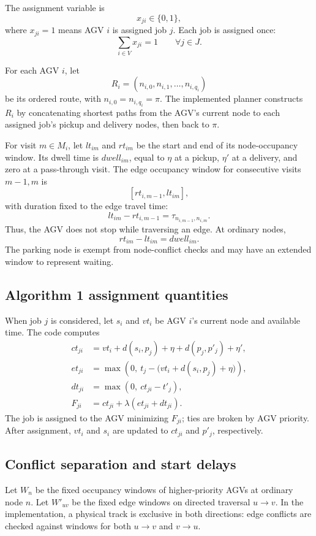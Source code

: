 The assignment variable is
\[
  x_{ji}\in\{0,1\},
\]
where $x_{ji}=1$ means AGV $i$ is assigned job $j$. Each job is assigned once:
\[
  \sum_{i\in V}x_{ji}=1\qquad \forall j\in J.
\]

For each AGV $i$, let
\[
  R_i=(n_{i,0},n_{i,1},\ldots,n_{i,q_i})
\]
be its ordered route, with $n_{i,0}=n_{i,q_i}=\pi$. The implemented planner
constructs $R_i$ by concatenating shortest paths from the AGV's current node
to each assigned job's pickup and delivery nodes, then back to $\pi$.

For visit $m\in M_i$, let $lt_{im}$ and $rt_{im}$ be the start and end of its
node-occupancy window. Its dwell time is $dwell_{im}$, equal to $\eta$ at a
pickup, $\eta'$ at a delivery, and zero at a pass-through visit. The edge
occupancy window for consecutive visits $m-1,m$ is
\[
  [rt_{i,m-1},lt_{im}],
\]
with duration fixed to the edge travel time:
\[
  lt_{im}-rt_{i,m-1}=\tau_{n_{i,m-1},n_{i,m}}.
\]
Thus, the AGV does not stop while traversing an edge. At ordinary nodes,
\[
  rt_{im}-lt_{im}=dwell_{im}.
\]
The parking node is exempt from node-conflict checks and may have an extended
window to represent waiting.

\subsection{Algorithm 1 assignment quantities}

When job $j$ is considered, let $s_i$ and $vt_i$ be AGV $i$'s current node and
available time. The code computes
\begin{align*}
  ct_{ji}
  &=vt_i+d(s_i,p_j)+\eta+d(p_j,p'_j)+\eta',\\
  et_{ji}
  &=\max\!\left(0,\ t_j-\bigl(vt_i+d(s_i,p_j)+\eta\bigr)\right),\\
  dt_{ji}
  &=\max(0,\ ct_{ji}-t'_j),\\
  F_{ji}
  &=ct_{ji}+\lambda(et_{ji}+dt_{ji}).
\end{align*}
The job is assigned to the AGV minimizing $F_{ji}$; ties are broken by AGV
priority. After assignment, $vt_i$ and $s_i$ are updated to $ct_{ji}$ and
$p'_j$, respectively.

\subsection{Conflict separation and start delays}

Let $W_n$ be the fixed occupancy windows of higher-priority AGVs at ordinary
node $n$. Let $W'_{uv}$ be the fixed edge windows on directed traversal
$u\to v$. In the implementation, a physical track is exclusive in both
directions: edge conflicts are checked against windows for both $u\to v$ and
$v\to u$.

